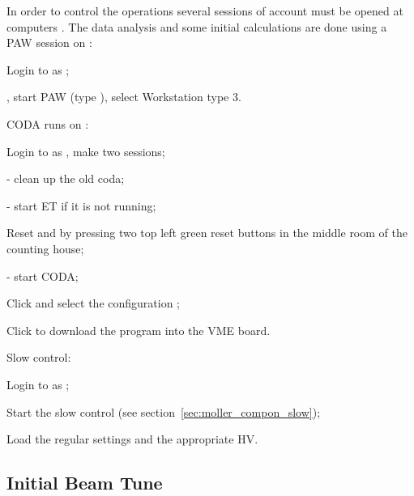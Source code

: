 {In order to control the operations several sessions
of  account must be opened at computers .
The data analysis and some initial calculations are done using a PAW\cite{PAWwww}
session on  :
 \begin{list}{--}{\setlength{\itemsep}{-0.15cm}}
   \item Login to  as ;
   \item {}, start PAW (type ), select Workstation type 3.  
 \end{list}
\noindent
CODA runs on : 
 \begin{list}{--}{\setlength{\itemsep}{-0.15cm}}
   \item Login to  as , make two sessions;
   \item {} - clean up the old coda;
   \item {} - start ET if it is not running;
   \item Reset  and  by pressing two top left green
         reset buttons in the middle room of the counting house;
   \item {} - start CODA;
   \item Click  and select the configuration ;
   \item Click  to download the program into the VME board.
 \end{list}

\noindent
Slow control:
 \begin{list}{--}{\setlength{\itemsep}{-0.15cm}}
   \item Login to  as ;
   \item Start the slow control (see section~\ref{sec:moller_compon_slow});
   \item Load the regular settings and the appropriate HV.
 \end{list}

\subsection {Initial Beam Tune}
\label{sec:moller_oper_initbeam}

}
